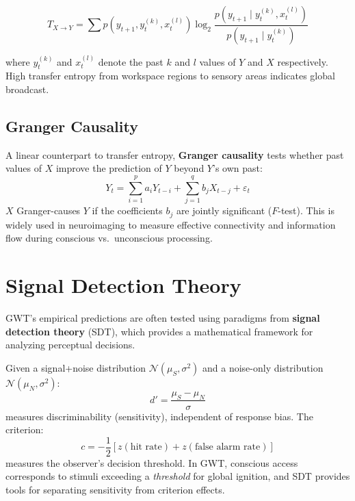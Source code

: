 \documentclass[11pt,a4paper]{report}
\begin{document}
\begin{mathbox}
\vspace{-8pt}
\[
  T_{X \to Y} = \sum p\!\left(y_{t+1}, y_t^{(k)}, x_t^{(l)}\right) \log_2 \frac{p\!\left(y_{t+1} \mid y_t^{(k)}, x_t^{(l)}\right)}{p\!\left(y_{t+1} \mid y_t^{(k)}\right)}
\]
\vspace{-10pt}
\end{mathbox}

where $y_t^{(k)}$ and $x_t^{(l)}$ denote the past $k$ and $l$ values of $Y$ and $X$ respectively. High transfer entropy from workspace regions to sensory areas indicates global broadcast.

\subsection{Granger Causality}

A linear counterpart to transfer entropy, \textbf{Granger causality} tests whether past values of $X$ improve the prediction of $Y$ beyond $Y$'s own past:
\[
  Y_t = \sum_{i=1}^{p} a_i Y_{t-i} + \sum_{j=1}^{q} b_j X_{t-j} + \varepsilon_t
\]
$X$ Granger-causes $Y$ if the coefficients $b_j$ are jointly significant ($F$-test). This is widely used in neuroimaging to measure effective connectivity and information flow during conscious vs.\ unconscious processing.

\section{Signal Detection Theory}

GWT's empirical predictions are often tested using paradigms from \textbf{signal detection theory} (SDT), which provides a mathematical framework for analyzing perceptual decisions.

\begin{definitionbox}
Given a signal+noise distribution $\mathcal{N}(\mu_S, \sigma^2)$ and a noise-only distribution $\mathcal{N}(\mu_N, \sigma^2)$:
\[
  d' = \frac{\mu_S - \mu_N}{\sigma}
\]
measures discriminability (sensitivity), independent of response bias. The criterion:
\[
  c = -\frac{1}{2}\left[z(\text{hit rate}) + z(\text{false alarm rate})\right]
\]
measures the observer's decision threshold. In GWT, conscious access corresponds to stimuli exceeding a \emph{threshold} for global ignition, and SDT provides tools for separating sensitivity from criterion effects.
\end{definitionbox}
\end{document}

